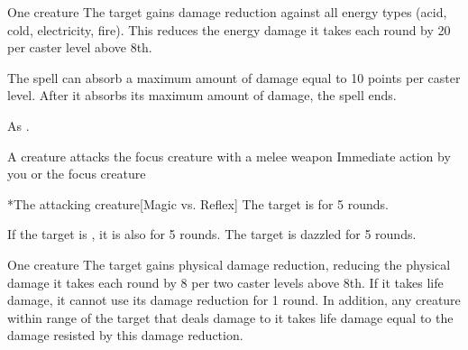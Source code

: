 \begin{spellheader}
\end{spellheader}
\begin{spelleffects}
    \begin{spelltarget}{One creature}
        \spelleffect The target gains damage reduction against all energy types (acid, cold, electricity, fire). This reduces the energy damage it takes each round by 20  per caster level above 8th.
        \par The spell can absorb a maximum amount of damage equal to 10 points per caster level. After it absorbs its maximum amount of damage, the spell ends.
    \end{spelltarget}
\end{spelleffects}
\begin{spellfooter}
    \spellnotes As .
\end{spellfooter}

\begin{spellheader}
    \spellrng{\rngclose}
\end{spellheader}
\begin{spelleffects}
    \begin{spelltrigger}{A creature attacks the focus creature with a melee weapon}
         Immediate action by you or the focus creature
        \spellrng{\rngclose}
        \begin{spelltarget}*{The attacking creature}[Magic vs. Reflex]
            \spellsuccess The target is \dazzled for 5 rounds.

            If the target is \bloodied, it is also \blinded for 5 rounds.
            \spellfailure The target is dazzled for 5 rounds.
        \end{spelltarget}
    \end{spelltrigger}
\end{spelleffects}

\begin{spellheader}
    \spellrng{\rngclose}
    \spelldur{\durshort}
\end{spellheader}
\begin{spelleffects}
    \begin{spelltarget}{One creature}
        \spelleffect The target gains physical damage reduction, reducing the physical damage it takes each round by 8  per two caster levels above 8th. If it takes life damage, it cannot use its damage reduction for 1 round. In addition, any creature within \rngmed range of the target that deals damage to it takes life damage equal to the damage resisted by this damage reduction.
    \end{spelltarget}
\end{spelleffects}

